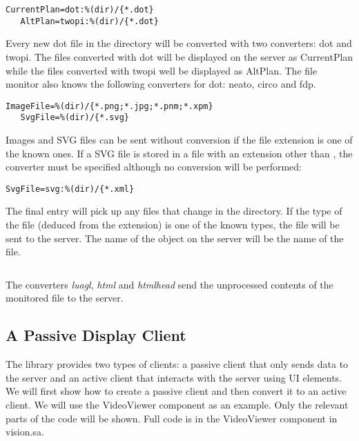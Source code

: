 \begin{Verbatim}[fontsize=\scriptsize,gobble=3]
   CurrentPlan=dot:%(dir)/{*.dot}
   AltPlan=twopi:%(dir)/{*.dot}
\end{Verbatim}

Every new dot file in the directory will be converted with two converters: dot
and twopi. The files converted with dot will be displayed on the server as
CurrentPlan while the files converted with twopi well be displayed as AltPlan.
The file monitor also knows the following converters for dot: neato, circo and
fdp.

\begin{Verbatim}[fontsize=\scriptsize,gobble=3]
   ImageFile=%(dir)/{*.png;*.jpg;*.pnm;*.xpm}
   SvgFile=%(dir)/{*.svg}
\end{Verbatim}

Images and SVG files can be sent without conversion if the file extension is
one of the known ones. If a SVG file is stored in a file with an extension
other than , the converter must be specified although no conversion
will be performed:

\begin{Verbatim}[fontsize=\scriptsize,gobble=3]
   SvgFile=svg:%(dir)/{*.xml}
\end{Verbatim}

The final entry will pick up any files that change in the directory. If the
type of the file (deduced from the extension) is one of the known types, the
file will be sent to the server. The name of the object on the server will be
the name of the file.

\begin{Verbatim}[fontsize=\scriptsize,gobble=3]
   %(dir)/{*}"
\end{Verbatim}

The converters {\em luagl}, {\em html} and {\em htmlhead} send the unprocessed
contents of the monitored file to the server.

\subsection{A Passive Display Client}\label{section:PassiveClient} 

The library provides two types of clients: a passive client that only sends
data to the server and an active client that interacts with the server using UI
elements. We will first show how to create a passive client and then convert it
to an active client. We will use the VideoViewer component as an example. Only
the relevant parts of the code will be shown. Full code is in the VideoViewer
component in vision.sa.

